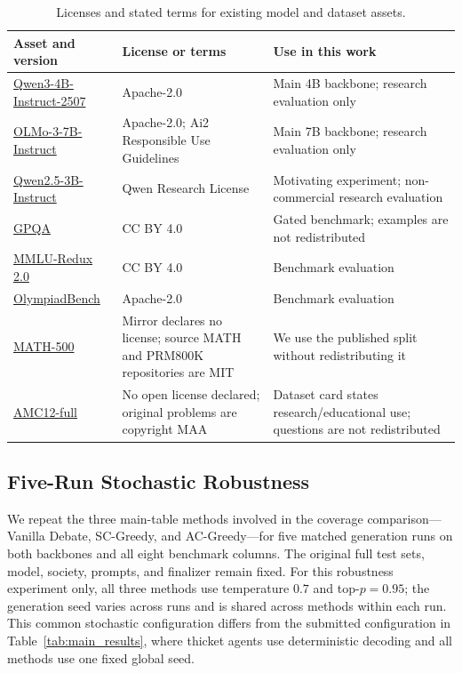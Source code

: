 \begin{table}[H]
\centering
\caption{Licenses and stated terms for existing model and dataset assets.}
\label{tab:asset_licenses}
\footnotesize
\begin{tabular}{p{}p{}p{}}
\toprule
Asset and version & License or terms & Use in this work \\
\midrule
\href{https://huggingface.co/Qwen/Qwen3-4B-Instruct-2507}{Qwen3-4B-Instruct-2507}
    & Apache-2.0 & Main 4B backbone; research evaluation only \\
\href{https://huggingface.co/allenai/Olmo-3-7B-Instruct}{OLMo-3-7B-Instruct}
    & Apache-2.0; Ai2 Responsible Use Guidelines
    & Main 7B backbone; research evaluation only \\
\href{https://huggingface.co/Qwen/Qwen2.5-3B-Instruct}{Qwen2.5-3B-Instruct}
    & Qwen Research License
    & Motivating experiment; non-commercial research evaluation \\
\href{https://huggingface.co/datasets/Idavidrein/gpqa}{GPQA}
    & CC BY 4.0 & Gated benchmark; examples are not redistributed \\
\href{https://huggingface.co/datasets/edinburgh-dawg/mmlu-redux-2.0}{MMLU-Redux 2.0}
    & CC BY 4.0 & Benchmark evaluation \\
\href{https://huggingface.co/datasets/Hothan/OlympiadBench}{OlympiadBench}
    & Apache-2.0 & Benchmark evaluation \\
\href{https://huggingface.co/datasets/HuggingFaceH4/MATH-500}{MATH-500}
    & Mirror declares no license; source MATH and PRM800K repositories are MIT
    & We use the published split without redistributing it \\
\href{https://huggingface.co/datasets/edev2000/amc12-full}{AMC12-full}
    & No open license declared; original problems are copyright MAA
    & Dataset card states research/educational use; questions are not redistributed \\
\bottomrule
\end{tabular}
\end{table}

\subsection{Five-Run Stochastic Robustness}
\label{app:stochastic_robustness}
We repeat the three main-table methods involved in the coverage comparison---
Vanilla Debate, SC-Greedy, and AC-Greedy---for five matched generation runs on
both backbones and all eight benchmark columns. The original full test sets,
model, society, prompts, and finalizer remain fixed. For this robustness
experiment only, all three methods use temperature $0.7$ and top-$p=0.95$; the
generation seed varies across runs and is shared across methods within each
run. This common stochastic configuration differs from the submitted
configuration in Table~\ref{tab:main_results}, where thicket agents use
deterministic decoding and all methods use one fixed global seed.

